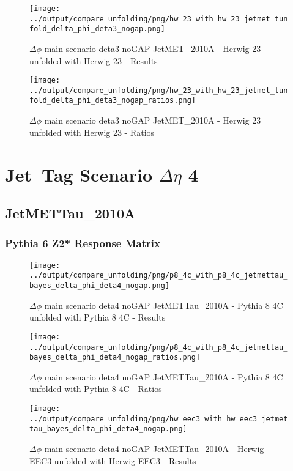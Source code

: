 \documentclass[11pt]{book}
\begin{document}
\begin{figure}[ht]
\centering
\texttt{[image: ../output/compare\_unfolding/png/hw\_23\_with\_hw\_23\_jetmet\_tunfold\_delta\_phi\_deta3\_nogap.png]}
\caption{$\Delta\phi$ main scenario deta3 noGAP JetMET\_2010A - Herwig 23 unfolded with Herwig 23 - Results}
\label{hw_23_hw_23_jetmet_tunfold_delta_phi_deta3_nogap_a}
\end{figure}

\begin{figure}[ht]
\centering
\texttt{[image: ../output/compare\_unfolding/png/hw\_23\_with\_hw\_23\_jetmet\_tunfold\_delta\_phi\_deta3\_nogap\_ratios.png]}
\caption{$\Delta\phi$ main scenario deta3 noGAP JetMET\_2010A - Herwig 23 unfolded with Herwig 23 - Ratios}
\label{hw_23_hw_23_jetmet_tunfold_delta_phi_deta3_nogap_b}
\end{figure}





\newpage
\chapter{Jet--Tag Scenario $\Delta\eta$ 4}
\section{JetMETTau\_2010A}
\subsection{Pythia 6 Z2* Response Matrix}


\begin{figure}[ht]
\centering
\texttt{[image: ../output/compare\_unfolding/png/p8\_4c\_with\_p8\_4c\_jetmettau\_bayes\_delta\_phi\_deta4\_nogap.png]}
\caption{$\Delta\phi$ main scenario deta4 noGAP JetMETTau\_2010A - Pythia 8 4C unfolded with Pythia 8 4C - Results}
\label{p8_p8_jetmettau_bayes_delta_phi_deta4_nogap_a}
\end{figure}

\begin{figure}[ht]
\centering
\texttt{[image: ../output/compare\_unfolding/png/p8\_4c\_with\_p8\_4c\_jetmettau\_bayes\_delta\_phi\_deta4\_nogap\_ratios.png]}
\caption{$\Delta\phi$ main scenario deta4 noGAP JetMETTau\_2010A - Pythia 8 4C unfolded with Pythia 8 4C - Ratios}
\label{p8_p8_jetmettau_bayes_delta_phi_deta4_nogap_b}
\end{figure}

\begin{figure}[ht]
\centering
\texttt{[image: ../output/compare\_unfolding/png/hw\_eec3\_with\_hw\_eec3\_jetmettau\_bayes\_delta\_phi\_deta4\_nogap.png]}
\caption{$\Delta\phi$ main scenario deta4 noGAP JetMETTau\_2010A - Herwig EEC3 unfolded with Herwig EEC3 - Results}
\label{hw_eec3_hw_eec3_jetmettau_bayes_delta_phi_deta4_nogap_a}
\end{figure}
\end{document}
